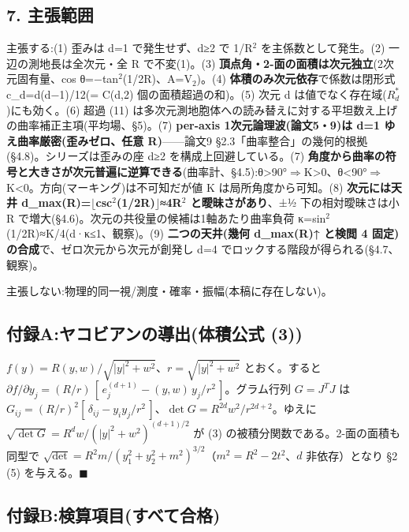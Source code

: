 \documentclass[
]{ltjsarticle}
\begin{document}
\subsection{7. 主張範囲}\label{ux4e3bux5f35ux7bc4ux56f2}

主張する:(1) 歪みは d=1 で発生せず、d≥2 で 1/R\(^{2}\)
を主係数として発生。(2) 一辺の測地長は全次元・全 R で不変(1)。(3)
\textbf{頂点角・2-面の面積は次元独立}(2次元固有量、cos
θ=−tan\(^{2}\)(1/2R)、A=V\(_{2}\))。(4)
\textbf{体積のみ次元依存}で係数は閉形式 c\_d=d(d−1)/12(= C(d,2)
個の面積超過の和)。(5) 次元 d
は値でなく存在域(\(R^{*}_{d}\))にも効く。(6) 超過 (11)
は多次元測地胞体への読み替えに対する平坦数え上げの曲率補正主項(平均場、§5)。(7)
\textbf{per-axis 1次元論理波(論文5・9)は d=1 ゆえ曲率厳密(歪みゼロ、任意
R)}------論文9 §2.3「曲率整合」の幾何的根拠(§4.8)。シリーズは歪みの座
d≥2 を構成上回避している。(7)
\textbf{角度から曲率の符号と大きさが次元普遍に逆算できる}(曲率計、§4.5):θ\textgreater90°\(\Longrightarrow\)K\textgreater0、θ\textless90°\(\Longrightarrow\)K\textless0。方向(マーキング)は不可知だが値
K は局所角度から可知。(8) \textbf{次元には天井
d\_max(R)=\(\lfloor\)csc\(^{2}\)(1/2R)\(\rfloor\)≈4R\(^{2}\)
と曖昧さがあり}、±½ 下の相対曖昧さは小 R
で増大(§4.6)。次元の共役量の候補は1軸あたり曲率負荷
κ=sin\(^{2}\)(1/2R)≈K/4(d·κ≤1、観察)。(9) \textbf{二つの天井(幾何
d\_max(R)↑ と検閲 4 固定)の合成}で、ゼロ次元から次元が創発し d=4
でロックする階段が得られる(§4.7、観察)。

主張しない:物理的同一視/測度・確率・振幅(本稿に存在しない)。

\subsection{付録A:ヤコビアンの導出(体積公式
(3))}\label{ux4ed8ux9332aux30e4ux30b3ux30d3ux30a2ux30f3ux306eux5c0eux51faux4f53ux7a4dux516cux5f0f-3}

\(f(y)=R(y,w)/\sqrt{|y|^2+w^2}\)、\(r=\sqrt{|y|^2+w^2}\) とおく。すると
\(\partial f/\partial y_j=(R/r)\,[\,e_j^{(d+1)} - (y,w)\,y_j/r^2\,]\)。グラム行列
\(G=J^{T}J\) は
\(G_{ij}=(R/r)^2[\,\delta_{ij} - y_i y_j/r^2\,]\)、\(\det G=R^{2d}w^2/r^{2d+2}\)。ゆえに
\(\sqrt{\det G}=R^{d}w/(|y|^2+w^2)^{(d+1)/2}\) が (3)
の被積分関数である。2-面の面積も同型で
\(\sqrt{\det}=R^2 m/(y_1^2+y_2^2+m^2)^{3/2}\)（\(m^2=R^2-2t^2\)、\(d\)
非依存）となり §2 (5) を与える。\(\blacksquare\)

\subsection{付録B:検算項目(すべて合格)}\label{ux4ed8ux9332bux691cux7b97ux9805ux76eeux3059ux3079ux3066ux5408ux683c}
\end{document}
